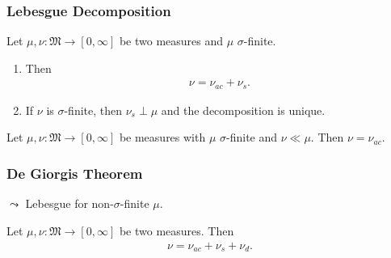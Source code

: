 \documentclass[10pt, hyperref={hidelinks}]{beamer}
\begin{document}
    \begin{frame}
        \frametitle{Lebesgue Decomposition}

        \begin{theorem} \label{thm:lebesgue_decomposition_theorem}
            Let \(\mu, \nu\colon \mathfrak{M} \to [0, \infty]\) be two measures and \(\mu\) \(\sigma\)-finite.
            \begin{enumerate}[label=(\roman*), wide]
                \item \label{thm:lebesgue_decomposition_theorem_1} Then
                \begin{align}
                    \nu = \nu_{ac} + \nu_s.
                \end{align}
                \item \label{thm:lebesgue_decomposition_theorem_2} If \(\nu\) is \(\sigma\)-finite, then \(\nu_s \perp \mu\) and the decomposition is unique.
            \end{enumerate}
        \end{theorem}

        \pause

        \begin{lemma} \label{lem:radon_nikodym_remark}
            Let \(\mu, \nu\colon \mathfrak{M} \to [0, \infty]\) be measures with \(\mu\) \(\sigma\)-finite and \(\nu \ll \mu\). Then \(\nu = \nu_{ac}\).
        \end{lemma}
    \end{frame}

    \begin{frame}
        \frametitle{De Giorgis Theorem}

        \(\leadsto\) Lebesgue for non-\(\sigma\)-finite \(\mu\).

        \pause

        \begin{theorem}
            Let \(\mu, \nu\colon \mathfrak{M} \to [0, \infty]\) be two measures. Then
            \begin{align}
                \nu = \nu_{ac} + \nu_s + \nu_d.
            \end{align}
        \end{theorem}
    \end{frame}
\end{document}
